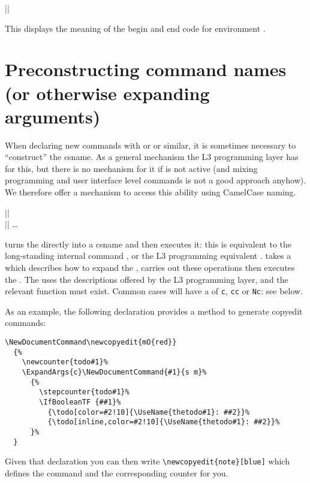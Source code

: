 \documentclass{ltxguide}
\begin{document}
\begin{decl}
  |\ShowEnvironment|       
\end{decl}
This displays the meaning of the begin and end code for environment .




\section[Preconstructing command names \\ (or otherwise expanding arguments)]
        {Preconstructing command names (or otherwise expanding arguments)}
\label{sec:preconstructing-csnames}

When declaring new commands with  or
 or similar, it is sometimes necessary to
``construct'' the csname. As a general mechanism the L3 programming
layer has  for this, but there is no mechanism for
it if  is not active (and mixing programming and user
interface level commands is not a good approach anyhow). We therefore
offer a mechanism to access this ability using CamelCase naming.

\begin{decl}
  |\UseName|   \\
  |\ExpandArgs|    \dots
\end{decl}

 turns the  directly into a csname and
then executes it: this is equivalent to the long-standing
\LaTeXe{} internal command , or the L3 programming
equivalent .  takes a  which
describes how to expand the , carries out these
operations then executes the . The  uses
the descriptions offered by the L3 programming layer, and the
relevant  function must exist. Common cases will
have a  of \texttt{c}, \texttt{cc} or \texttt{Nc}: see below.

As an example, the following declaration provides a method to generate
copyedit commands:
\begin{verbatim}
\NewDocumentCommand\newcopyedit{mO{red}}
  {%
    \newcounter{todo#1}%
    \ExpandArgs{c}\NewDocumentCommand{#1}{s m}%
      {%
        \stepcounter{todo#1}%
        \IfBooleanTF {##1}%
          {\todo[color=#2!10]{\UseName{thetodo#1}: ##2}}%
          {\todo[inline,color=#2!10]{\UseName{thetodo#1}: ##2}}%
      }%
  }
\end{verbatim}
Given that declaration you can then write
\verb/\newcopyedit{note}[blue]/ which defines the command 
and the corresponding counter for you.
\end{document}
